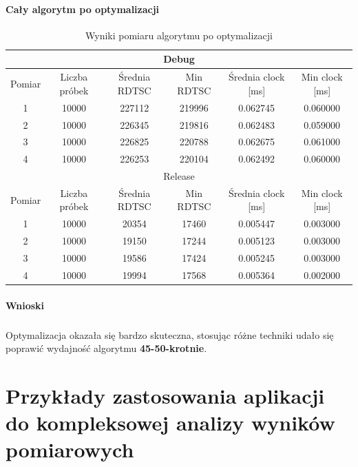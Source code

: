 \documentclass[12pt]{report}
\begin{document}
	\subsubsection{Cały algorytm po optymalizacji}
	\begin{table}[H]
		\centering
		\caption{Wyniki pomiaru algorytmu po optymalizacji}
		\begin{tabular}{|c|c|c|c|c|c|} \hline
			\multicolumn{6}{|c|}{Debug} \\\hline
			Pomiar  & Liczba próbek & Średnia RDTSC & Min RDTSC & Średnia clock [ms] & Min clock [ms] \\\hline
			1 & 10000 & 227112 & 219996 & 0.062745 & 0.060000 \\\hline
			2 & 10000 & 226345 & 219816 & 0.062483 & 0.059000 \\\hline
			3 & 10000 & 226825 & 220788 & 0.062675 & 0.061000 \\\hline
			4 & 10000 & 226253 & 220104 & 0.062492 & 0.060000 \\\hline
			\hline
			\multicolumn{6}{|c|}{Release} \\\hline
			Pomiar  & Liczba próbek & Średnia RDTSC & Min RDTSC & Średnia clock [ms] & Min clock [ms] \\\hline
			1 & 10000 & 20354 & 17460 & 0.005447 & 0.003000 \\\hline
			2 & 10000 & 19150 & 17244 & 0.005123 & 0.003000 \\\hline
			3 & 10000 & 19586 & 17424 & 0.005245 & 0.003000 \\\hline
			4 & 10000 & 19994 & 17568 & 0.005364 & 0.002000 \\\hline
		\end{tabular}
	\end{table}
	
	\subsubsection{Wnioski}
	\paragraph{}
	Optymalizacja okazała się bardzo skuteczna, stosując różne techniki udało się poprawić wydajność algorytmu \textbf{45-50-krotnie}.
	
	\chapter{Przykłady zastosowania aplikacji do kompleksowej analizy wyników pomiarowych}
\end{document}
